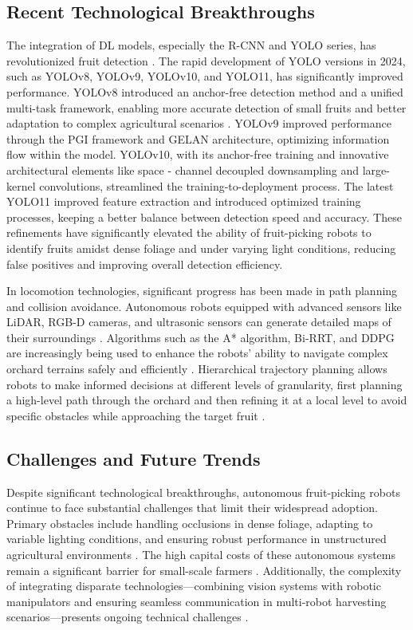 \documentclass{ieeeaccess}
\begin{document}
\subsection{ Recent Technological Breakthroughs }
The integration of DL models, especially the R-CNN and YOLO series, has revolutionized fruit detection \cite{hou2023overview, suresh2023selective}. The rapid development of YOLO versions in 2024, such as YOLOv8, YOLOv9, YOLOv10, and YOLO11, has significantly improved performance. YOLOv8 introduced an anchor-free detection method and a unified multi-task framework, enabling more accurate detection of small fruits and better adaptation to complex agricultural scenarios \cite{li2023mta}. YOLOv9 improved performance through the PGI framework and GELAN architecture, optimizing information flow within the model. YOLOv10, with its anchor-free training and innovative architectural elements like space - channel decoupled downsampling and large-kernel convolutions, streamlined the training-to-deployment process. The latest YOLO11 improved feature extraction and introduced optimized training processes, keeping a better balance between detection speed and accuracy. These refinements have significantly elevated the ability of fruit-picking robots to identify fruits amidst dense foliage and under varying light conditions, reducing false positives and improving overall detection efficiency.


In locomotion technologies, significant progress has been made in path planning and collision avoidance. Autonomous robots equipped with advanced sensors like LiDAR, RGB-D cameras, and ultrasonic sensors can generate detailed maps of their surroundings \cite{liu2024hierarchical}. Algorithms such as the A* algorithm, Bi-RRT, and DDPG are increasingly being used to enhance the robots' ability to navigate complex orchard terrains safely and efficiently \cite{gai2022fruit, rajendran2024towards}. Hierarchical trajectory planning allows robots to make informed decisions at different levels of granularity, first planning a high-level path through the orchard and then refining it at a local level to avoid specific obstacles while approaching the target fruit \cite{liu2024hierarchical}.

\subsection{Challenges and Future Trends}
Despite significant technological breakthroughs, autonomous fruit-picking robots continue to face substantial challenges that limit their widespread adoption. Primary obstacles include handling occlusions in dense foliage, adapting to variable lighting conditions, and ensuring robust performance in unstructured agricultural environments \cite{hou2023overview, suresh2023selective}. The high capital costs of these autonomous systems remain a significant barrier for small-scale farmers \cite{zhang2024automatic}. Additionally, the complexity of integrating disparate technologies—combining vision systems with robotic manipulators and ensuring seamless communication in multi-robot harvesting scenarios—presents ongoing technical challenges \cite{li2023multi, rajendran2024towards}.
\end{document}
